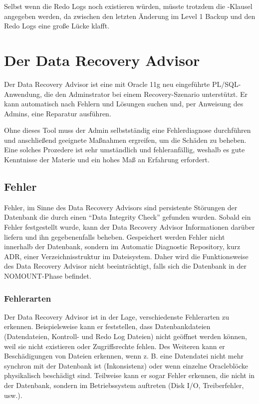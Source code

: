         Selbst wenn die Redo Logs noch existieren würden, müsste trotzdem die -Klausel angegeben werden, da zwischen den letzten Änderung im Level 1 Backup und den Redo Logs eine große Lücke klafft.
    \section{Der Data Recovery Advisor}
      Der Data Recovery Advisor ist eine mit Oracle 11g neu eingeführte PL/SQL-Anwendung, die den Adminstrator bei einem Recovery-Szenario unterstützt. Er kann automatisch nach Fehlern und Lösungen suchen und, per Anweisung des Admins, eine Reparatur ausführen.

      Ohne dieses Tool muss der Admin selbstständig eine Fehlerdiagnose durchführen und anschließend geeignete Maßnahmen ergreifen, um die Schäden zu beheben. Eine solches Prozedere ist sehr umständlich und fehleranfällig, weshalb es gute Kenntnisse der Materie und ein hohes Maß an Erfahrung erfordert.
      \subsection{Fehler}
        Fehler, im Sinne des Data Recovery Advisors sind persistente Störungen der Datenbank die durch einen \enquote{Data Integrity Check} gefunden wurden. Sobald ein Fehler festgestellt wurde, kann der Data Recovery Advisor Informationen darüber liefern und ihn gegeben\-en\-falls beheben. Gespeichert werden Fehler nicht innerhalb der Datenbank, sondern im Automatic Diagnostic Repository, kurz ADR, einer Verzeichnisstruktur im Dateisystem. Daher wird die Funktionsweise des Data Recovery Advisor nicht beeinträchtigt, falls sich die Datenbank in der NOMOUNT-Phase befindet.
        \subsubsection{Fehlerarten}
          Der Data Recovery Advisor ist in der Lage, verschiedenste Fehlerarten zu erkennen. Beispielsweise kann er feststellen, dass Datenbankdateien (Datendateien, Kontroll- und Redo Log Dateien) nicht geöffnet werden können, weil sie nicht existieren oder Zugriffsrechte fehlen. Des Weiteren kann er Beschädigungen von Dateien erkennen, wenn z. B. eine Datendatei nicht mehr synchron mit der Datenbank ist (Inkonsistenz) oder wenn einzelne Oracleblöcke physikalisch beschädigt sind. Teilweise kann er sogar Fehler erkennen, die nicht in der Datenbank, sondern im Betriebssystem auftreten (Disk I/O, Treiberfehler, usw.).
